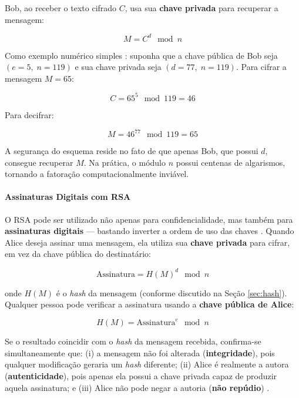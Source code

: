 Bob, ao receber o texto cifrado $C$, usa sua \textbf{chave privada} para recuperar a mensagem:

\begin{equation}
\label{eq:rsa-decifra}
M = C^d \mod n
\end{equation}

Como exemplo numérico simples \cite{tomaz2014}: suponha que a chave pública de Bob seja $(e=5,\; n=119)$ e sua chave privada seja $(d=77,\; n=119)$. Para cifrar a mensagem $M = 65$:

\begin{equation}
\label{eq:rsa-cifra-ex}
C = 65^5 \mod 119 = 46
\end{equation}

Para decifrar:

\begin{equation}
\label{eq:rsa-decifra-ex}
M = 46^{77} \mod 119 = 65
\end{equation}

A segurança do esquema reside no fato de que apenas Bob, que possui $d$, consegue recuperar $M$. Na prática, o módulo $n$ possui centenas de algarismos, tornando a fatoração computacionalmente inviável.

\paragraph{Assinaturas Digitais com RSA}

O RSA pode ser utilizado não apenas para confidencialidade, mas também para \textbf{assinaturas digitais} --- bastando inverter a ordem de uso das chaves \cite{tomaz2014}. Quando Alice deseja assinar uma mensagem, ela utiliza sua \textbf{chave privada} para cifrar, em vez da chave pública do destinatário:

\begin{equation}
\label{eq:assinatura}
\text{Assinatura} = H(M)^d \mod n
\end{equation}

onde $H(M)$ é o \textit{hash} da mensagem (conforme discutido na Seção \ref{sec:hash}). Qualquer pessoa pode verificar a assinatura usando a \textbf{chave pública de Alice}:

\begin{equation}
\label{eq:verifica-assinatura}
H(M) = \text{Assinatura}^e \mod n
\end{equation}

Se o resultado coincidir com o \textit{hash} da mensagem recebida, confirma-se simultaneamente que: (i) a mensagem não foi alterada (\textbf{integridade}), pois qualquer modificação geraria um \textit{hash} diferente; (ii) Alice é realmente a autora (\textbf{autenticidade}), pois apenas ela possui a chave privada capaz de produzir aquela assinatura; e (iii) Alice não pode negar a autoria (\textbf{não repúdio}) \cite{tomaz2014}.


